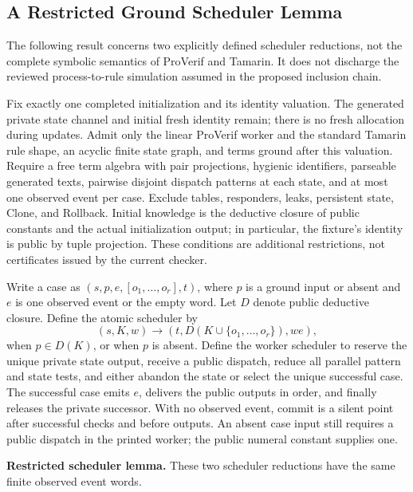 \subsection{A Restricted Ground Scheduler Lemma}
\label{app:restricted-scheduler}

The following result concerns two explicitly defined scheduler reductions,
not the complete symbolic semantics of ProVerif and Tamarin. It does not
discharge the reviewed process-to-rule simulation assumed in the proposed
inclusion chain.

Fix exactly one completed initialization and its identity valuation.
The generated private state channel and initial fresh identity remain;
there is no fresh allocation during updates. Admit only the linear
ProVerif worker and the standard Tamarin rule shape, an acyclic finite
state graph, and terms ground after this valuation. Require a free term
algebra with pair projections, hygienic identifiers, parseable generated
texts, pairwise disjoint dispatch patterns at each state, and at most one
observed event per case. Exclude tables, responders, leaks, persistent
state, Clone, and Rollback. Initial knowledge is the deductive closure of
public constants and the actual initialization output; in particular,
the fixture's identity is public by tuple projection. These conditions
are additional restrictions, not certificates issued by the current checker.

Write a case as $(s,p,e,[o_1,\ldots,o_r],t)$, where $p$ is a ground
input or absent and $e$ is one observed event or the empty word.
Let $D$ denote public deductive closure. Define the atomic scheduler by
\[
 (s,K,w)\longrightarrow
 (t,D(K\cup\{o_1,\ldots,o_r\}),we),
\]
when $p\in D(K)$, or when $p$ is absent.
Define the worker scheduler to reserve the unique private state output,
receive a public dispatch, reduce all parallel pattern and state tests,
and either abandon the state or select the unique successful case.
The successful case emits $e$, delivers the public outputs in order,
and finally releases the private successor. With no observed event,
commit is a silent point after successful checks and before outputs.
An absent case input still requires a public dispatch in the printed
worker; the public numeral constant supplies one.

\noindent\textbf{Restricted scheduler lemma.}
These two scheduler reductions have the same finite observed event words.

